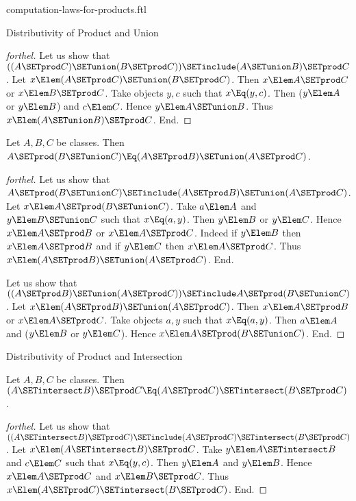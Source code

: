 \documentclass{stex}
\begin{document}
\begin{smodule}{computation-laws-for-products.ftl}
\begin{sfragment}{Distributivity of Product and Union}
\begin{proof}[forthel]
    Let us show that $((A \SETprod C) \SETunion (B \SETprod C)) \SETinclude (A \SETunion B) \SETprod C$. %
      Let $x \Elem (A \SETprod C) \SETunion (B \SETprod C)$.
      Then $x \Elem A \SETprod C$ or $x \Elem B \SETprod C$.
      Take objects $y, c$ such that $x \Eq (y, c)$.
      Then ($y \Elem A$ or $y \Elem B$) and $c \Elem C$.
      Hence $y \Elem A \SETunion B$.
      Thus $x \Elem (A \SETunion B) \SETprod C$.
    End.
  \end{proof}

  \begin{proposition}[forthel,id=FOUNDATIONS_05_476526841692160]
    Let $A, B, C$ be classes.
    Then $A \SETprod (B \SETunion C) \Eq (A \SETprod B) \SETunion (A \SETprod C)$.
  \end{proposition}
  \begin{proof}[forthel]
    Let us show that $A \SETprod (B \SETunion C) \SETinclude (A \SETprod B) \SETunion (A \SETprod C)$.
      Let $x \Elem A \SETprod (B \SETunion C)$.
      Take $a \Elem A$ and $y \Elem B \SETunion C$ such that $x \Eq (a, y)$.
      Then $y \Elem B$ or $y \Elem C$.
      Hence $x \Elem A \SETprod B$ or $x \Elem A \SETprod C$.
      Indeed if $y \Elem B$ then $x \Elem A \SETprod B$ and if $y \Elem C$ then $x \Elem A \SETprod C$.
      Thus $x \Elem (A \SETprod B) \SETunion (A \SETprod C)$.
    End.

    Let us show that $((A \SETprod B) \SETunion (A \SETprod C)) \SETinclude A \SETprod (B \SETunion C)$.
      Let $x \Elem (A \SETprod B) \SETunion (A \SETprod C)$.
      Then $x \Elem A \SETprod B$ or $x \Elem A \SETprod C$.
      Take objects $a, y$ such that $x \Eq (a, y)$.
      Then $a \Elem A$ and ($y \Elem B$ or $y \Elem C$).
      Hence $x \Elem A \SETprod (B \SETunion C)$.
    End.
  \end{proof}
\end{sfragment}

\begin{sfragment}{Distributivity of Product and Intersection}
  \begin{proposition}[forthel,id=FOUNDATIONS_05_1249567930580992]
    Let $A, B, C$ be classes.
    Then $(A \SETintersect B) \SETprod C \Eq (A \SETprod C) \SETintersect (B \SETprod C)$.
  \end{proposition}
  \begin{proof}[forthel]
    Let us show that $((A \SETintersect B) \SETprod C) \SETinclude (A \SETprod C) \SETintersect (B \SETprod C)$. %
      Let $x \Elem (A \SETintersect B) \SETprod C$.
      Take $y \Elem A \SETintersect B$ and $c \Elem C$ such that $x \Eq (y, c)$.
      Then $y \Elem A$ and $y \Elem B$.
      Hence $x \Elem A \SETprod C$ and $x \Elem B \SETprod C$.
      Thus $x \Elem (A \SETprod C) \SETintersect (B \SETprod C)$.
    End.


\end{proof}
\end{sfragment}
\end{smodule}
\end{document}
